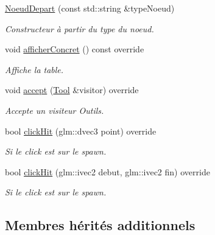 \begin{DoxyCompactItemize}
\item 
\hyperlink{class_noeud_depart_a003d2fbed3f4e142a9187a8152a4663d}{Noeud\-Depart} (const std\-::string \&type\-Noeud)
\begin{DoxyCompactList}\small\item\em Constructeur à partir du type du noeud. \end{DoxyCompactList}\item 
void \hyperlink{class_noeud_depart_a3d0647c1d7f75719fe25c778d9624922}{afficher\-Concret} () const override
\begin{DoxyCompactList}\small\item\em Affiche la table. \end{DoxyCompactList}\item 
void \hyperlink{class_noeud_depart_a5c105e25f600256c8933f70e07608413}{accept} (\hyperlink{class_tool}{Tool} \&visitor) override
\begin{DoxyCompactList}\small\item\em Accepte un visiteur Outils. \end{DoxyCompactList}\item 
\hypertarget{class_noeud_depart_a5bbaf0ff7096cff7e73f5054014b723e}{bool \hyperlink{class_noeud_depart_a5bbaf0ff7096cff7e73f5054014b723e}{click\-Hit} (glm\-::dvec3 point) override}\label{class_noeud_depart_a5bbaf0ff7096cff7e73f5054014b723e}

\begin{DoxyCompactList}\small\item\em Si le click est sur le spawn. \end{DoxyCompactList}\item 
\hypertarget{class_noeud_depart_a2dfe8b7300b4f1933993d44754e8f53f}{bool \hyperlink{class_noeud_depart_a2dfe8b7300b4f1933993d44754e8f53f}{click\-Hit} (glm\-::ivec2 debut, glm\-::ivec2 fin) override}\label{class_noeud_depart_a2dfe8b7300b4f1933993d44754e8f53f}

\begin{DoxyCompactList}\small\item\em Si le click est sur le spawn. \end{DoxyCompactList}\end{DoxyCompactItemize}

\subsection*{Membres hérités additionnels}


